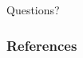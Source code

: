 \documentclass{beamer}
\begin{document}
\begin{frame}
\begin{center}
\textcolor{CBlue}{\Huge Questions?}
\end{center}
\end{frame}

\begin{frame}[allowframebreaks]
    \footnotesize
    \frametitle{References}
    \printbibliography
\end{frame}
\end{document}
